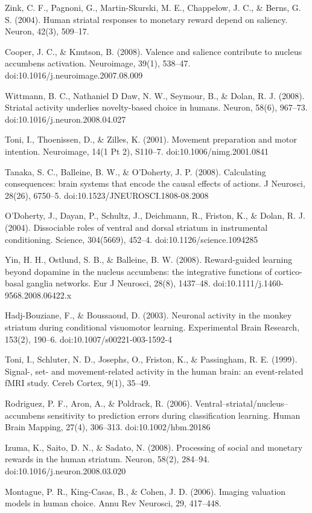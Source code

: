 Zink, C. F., Pagnoni, G., Martin-Skurski, M. E., Chappelow, J. C., & Berns, G. S. (2004). Human striatal responses to monetary reward depend on saliency. Neuron, 42(3), 509–17.

Cooper, J. C., & Knutson, B. (2008). Valence and salience contribute to nucleus accumbens activation. Neuroimage, 39(1), 538–47. doi:10.1016/j.neuroimage.2007.08.009

Wittmann, B. C., Nathaniel D Daw, N. W., Seymour, B., & Dolan, R. J. (2008). Striatal activity underlies novelty-based choice in humans. Neuron, 58(6), 967–73. doi:10.1016/j.neuron.2008.04.027

Toni, I., Thoenissen, D., & Zilles, K. (2001). Movement preparation and motor intention. Neuroimage, 14(1 Pt 2), S110–7. doi:10.1006/nimg.2001.0841

Tanaka, S. C., Balleine, B. W., & O'Doherty, J. P. (2008). Calculating consequences: brain systems that encode the causal effects of actions. J Neurosci, 28(26), 6750–5. doi:10.1523/JNEUROSCI.1808-08.2008

O'Doherty, J., Dayan, P., Schultz, J., Deichmann, R., Friston, K., & Dolan, R. J. (2004). Dissociable roles of ventral and dorsal striatum in instrumental conditioning. Science, 304(5669), 452–4. doi:10.1126/science.1094285

Yin, H. H., Ostlund, S. B., & Balleine, B. W. (2008). Reward-guided learning beyond dopamine in the nucleus accumbens: the integrative functions of cortico-basal ganglia networks. Eur J Neurosci, 28(8), 1437–48. doi:10.1111/j.1460-9568.2008.06422.x

Hadj-Bouziane, F., & Boussaoud, D. (2003). Neuronal activity in the monkey striatum during conditional visuomotor learning. Experimental Brain Research, 153(2), 190–6. doi:10.1007/s00221-003-1592-4

Toni, I., Schluter, N. D., Josephs, O., Friston, K., & Passingham, R. E. (1999). Signal-, set- and movement-related activity in the human brain: an event-related fMRI study. Cereb Cortex, 9(1), 35–49.

Rodriguez, P. F., Aron, A., & Poldrack, R. (2006). Ventral–striatal/nucleus–accumbens sensitivity to prediction errors during classification learning. Human Brain Mapping, 27(4), 306–313. doi:10.1002/hbm.20186

Izuma, K., Saito, D. N., & Sadato, N. (2008). Processing of social and monetary rewards in the human striatum. Neuron, 58(2), 284–94. doi:10.1016/j.neuron.2008.03.020

Montague, P. R., King-Casas, B., & Cohen, J. D. (2006). Imaging valuation models in human choice. Annu Rev Neurosci, 29, 417–448.

